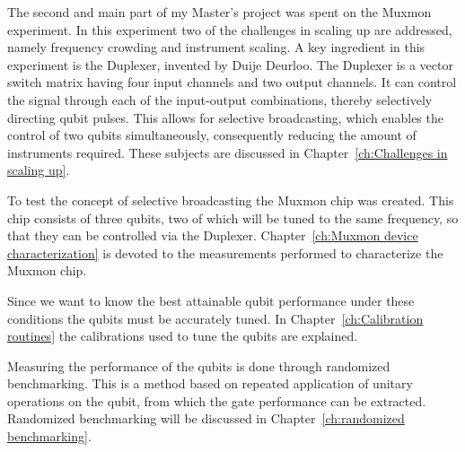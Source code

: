 \documentclass[12pt]{report}
\begin{document}
  The second and main part of my Master's project was spent on the Muxmon experiment. In this experiment two of the challenges in scaling up are addressed, namely frequency crowding and instrument scaling. A key ingredient in this experiment is the Duplexer, invented by Duije Deurloo. The Duplexer is a vector switch matrix having four input channels and two output channels. It can control the signal through each of the input-output combinations, thereby selectively directing qubit pulses. This allows for selective broadcasting, which enables the control of two qubits simultaneously, consequently reducing the amount of instruments required. These subjects are discussed in Chapter~\ref{ch:Challenges in scaling up}.

  To test the concept of selective broadcasting the Muxmon chip was created. This chip consists of three qubits, two of which will be tuned to the same frequency, so that they can be controlled via the Duplexer. Chapter~\ref{ch:Muxmon device characterization} is devoted to the measurements performed to characterize the Muxmon chip.

  Since we want to know the best attainable qubit performance under these conditions the qubits must be accurately tuned. In Chapter~\ref{ch:Calibration routines} the calibrations used to tune the qubits are explained.

  Measuring the performance of the qubits is done through randomized benchmarking. This is a method based on repeated application of unitary operations on the qubit, from which the gate performance can be extracted. Randomized benchmarking will be discussed in Chapter~\ref{ch:randomized benchmarking}.







\begin{appendices}



\end{appendices}



\end{document}
